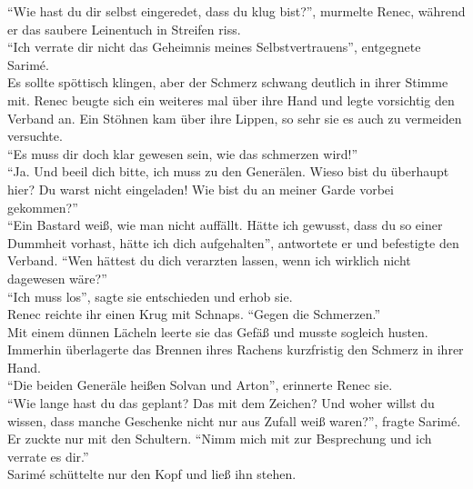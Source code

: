 ``Wie hast du dir selbst eingeredet, dass du klug bist?'', murmelte Renec, während er das saubere 
Leinentuch in Streifen riss.\\
``Ich verrate dir nicht das Geheimnis meines Selbstvertrauens'', entgegnete Sarimé.\\
Es sollte spöttisch klingen, aber der Schmerz schwang deutlich in ihrer Stimme mit. Renec beugte 
sich ein weiteres mal über ihre Hand und legte vorsichtig den Verband an. Ein Stöhnen kam über ihre 
Lippen, so sehr sie es auch zu vermeiden versuchte.\\
``Es muss dir doch klar gewesen sein, wie das schmerzen wird!''\\
``Ja. Und beeil dich bitte, ich muss zu den Generälen. Wieso bist du überhaupt hier? Du warst nicht 
eingeladen! Wie bist du an meiner Garde vorbei gekommen?''\\
``Ein Bastard weiß, wie man nicht auffällt. Hätte ich gewusst, dass du so einer Dummheit vorhast, 
hätte ich dich aufgehalten'', antwortete er und befestigte den Verband. ``Wen hättest du dich 
verarzten lassen, wenn ich wirklich nicht dagewesen wäre?''\\
``Ich muss los'', sagte sie entschieden und erhob sie.\\
Renec reichte ihr einen Krug mit Schnaps. ``Gegen die Schmerzen.''\\
Mit einem dünnen Lächeln leerte sie das Gefäß und musste sogleich husten. Immerhin überlagerte das 
Brennen ihres Rachens kurzfristig den Schmerz in ihrer Hand.\\
``Die beiden Generäle heißen Solvan und Arton'', erinnerte Renec sie.\\
``Wie lange hast du das geplant? Das mit dem Zeichen? Und woher willst du wissen, dass manche 
Geschenke nicht nur aus Zufall weiß waren?'', fragte Sarimé.\\
Er zuckte nur mit den Schultern. ``Nimm mich mit zur Besprechung und ich verrate es dir.''\\
Sarimé schüttelte nur den Kopf und ließ ihn stehen.\\

